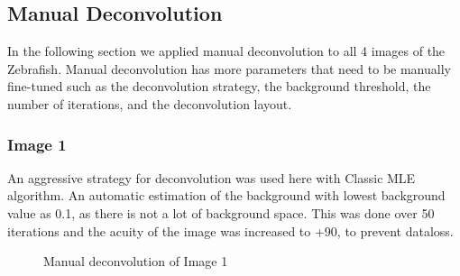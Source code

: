 \documentclass{article}
\begin{document}
\subsection*{Manual Deconvolution}
In the following section we applied manual deconvolution to all 4 images of the Zebrafish. Manual deconvolution has more parameters that need to be manually fine-tuned such as the deconvolution strategy, the background threshold, the number of iterations, and the deconvolution layout. 
\subsubsection*{Image 1}
An aggressive strategy for deconvolution was used here with Classic MLE algorithm. An automatic estimation of the background with lowest background value as 0.1, as there is not a lot of background space. This was done over 50 iterations and the acuity of the image was increased to +90, to prevent dataloss. \newline
\begin{figure}[h!]
\centering
{}
\vspace{5 mm}
\caption{Manual deconvolution of Image 1}
\label{fig:manual-deconvolve-image1}
\end{figure}
\end{document}
